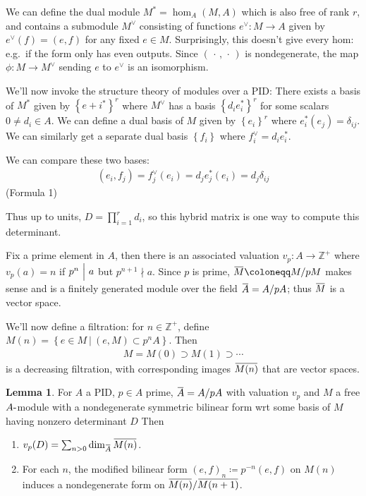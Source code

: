 \documentclass[11pt]{scrartcl}
\theoremstyle{definition}
\theoremstyle{theorem}
\newtheorem{lemma}[theorem]{Lemma}
\theoremstyle{proof}
\theoremstyle{definition}
\theoremstyle{break}
\theoremstyle{problem}
\providecommand{\tightlist}{%
  \setlength{\itemsep}{0pt}\setlength{\parskip}{0pt}}
\newcommand{\ZZ}[0]{{\mathbb{Z}}}
\newcommand{\dash}[0]{{\hbox{-}}}
\newcommand{\definedas}[0]{\coloneqq}
\newcommand{\divides}[0]{{~\Bigm|~}}
\newcommand{\dual}[0]{^\vee}
\newcommand{\notdivides}[0]{\nmid}
\newcommand{\suchthat}[0]{{~\mathrel{\Big|}~}}
\newcommand{\theset}[1]{\left\{{#1}\right\}}
\newcommand{\wait}[0]{{\,\cdot\,}}
\renewcommand{\bar}[1]{\mkern 1.5mu\overline{\mkern-1.5mu#1\mkern-1.5mu}\mkern 1.5mu}
\renewcommand{\to}[0]{\longrightarrow}
\begin{document}
We can define the dual module \(M^* = \hom_A(M, A)\) which is also free
of rank \(r\), and contains a submodule \(M\dual\) consisting of
functions \(e\dual: M \to A\) given by \(e\dual(f) = (e, f)\) for any
fixed \(e\in M\). Surprisingly, this doesn't give every hom: e.g.~if the
form only has even outputs. Since \((\wait, \wait)\) is nondegenerate,
the map \(\phi: M\to M\dual\) sending \(e\) to \(e\dual\) is an
isomorphism.

We'll now invoke the structure theory of modules over a PID: There
exists a basis of \(M^*\) given by \(\theset{e+i^*}^r\) where \(M\dual\)
has a basis \(\theset{d_i e_i^*}^r\) for some scalars
\(0\neq d_i \in A\). We can define a dual basis of \(M\) given by
\(\theset{e_i}^r\) where \(e_i^*(e_j) = \delta_{ij}\). We can similarly
get a separate dual basis \(\theset{f_i}\) where
\(f_i\dual = d_i e_i^*\).

We can compare these two bases:
\begin{align*}
(e_i, f_j) = f_j\dual(e_i) = d_j e_j^* (e_i) = d_j \delta_{ij}
\end{align*} (Formula 1)

Thus up to units, \(D = \prod_{i=1}^r d_i\), so this hybrid matrix is
one way to compute this determinant.

Fix a prime element in \(A\), then there is an associated valuation
\(v_p: A \to \ZZ^+\) where \(v_p(a) = n\) if \(p^n \divides a\) but
\(p^{n+1}\notdivides a\). Since \(p\) is prime,
\(\bar M \definedas M/pM\) makes sense and is a finitely generated
module over the field \(\bar A = A/pA\); thus \(\bar M\) is a vector
space.

We'll now define a filtration: for \(n\in \ZZ^+\), define
\(M(n) = \theset{e\in M\suchthat (e, M) \subset p^n A}\). Then
\begin{align*}
M = M(0) \supset M(1) \supset \cdots
\end{align*} is a decreasing filtration, with corresponding images
\(\bar{M(n)}\) that are vector spaces.

\begin{lemma}

For \(A\) a PID, \(p\in A\) prime, \(\bar A = A/pA\) with valuation
\(v_p\) and \(M\) a free \(A\dash\)module with a nondegenerate symmetric
bilinear form wrt some basis of \(M\) having nonzero determinant \(D\)
Then

\begin{enumerate}
\def\labelenumi{\alph{enumi}.}
\tightlist
\item
  \(v_p(D) = \sum_{n > 0} \dim_{\bar A} \bar{M(n)}\).
\item
  For each \(n\), the modified bilinear form
  \((e, f)_n \definedas p^{-n} (e, f)\) on \(M(n)\) induces a
  nondegenerate form on \(\bar{M(n)} / \bar{M(n+1)}\).
\end{enumerate}

\end{lemma}
\end{document}
